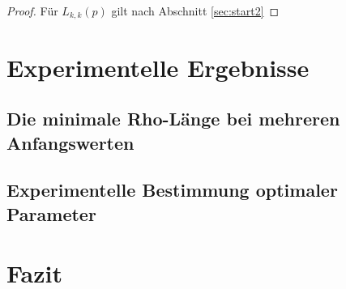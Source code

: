 \documentclass[a4paper, 10pt, ngerman]{article}
\begin{document}
\begin{proof}
    Für $L_{k, k}(p)$ gilt nach Abschnitt \ref{sec:start2}
\end{proof}

\section{Experimentelle Ergebnisse}\label{sec:ex}

\subsection{Die minimale Rho-Länge bei mehreren Anfangswerten}

\subsection{Experimentelle Bestimmung optimaler Parameter}

\section{Fazit}

\printbibliography
\end{document}
